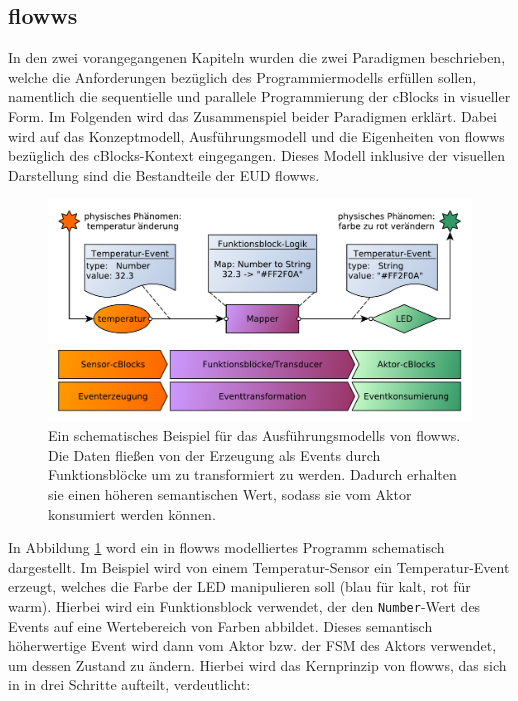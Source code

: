 \subsection{flowws}
In den zwei vorangegangenen Kapiteln wurden die zwei Paradigmen beschrieben, welche die Anforderungen bezüglich des Programmiermodells erfüllen sollen, namentlich die sequentielle und parallele Programmierung der cBlocks in visueller Form. Im Folgenden wird das Zusammenspiel beider Paradigmen erklärt. Dabei wird auf das Konzeptmodell, Ausführungsmodell und die Eigenheiten von flowws bezüglich des cBlocks-Kontext eingegangen. Dieses Modell inklusive der visuellen Darstellung sind die Bestandteile der \ac{EUD} flowws.

\begin{figure}[h]
  \centering
  \includegraphics[width=1\textwidth]{bilder/chapter4/chapter4_2/flowwsschematicexample.pdf}
  \caption{Ein schematisches Beispiel für das Ausführungsmodells von flowws. Die Daten fließen von der Erzeugung als Events durch Funktionsblöcke um zu transformiert zu werden. Dadurch erhalten sie einen höheren semantischen Wert, sodass sie vom Aktor konsumiert werden können.}
  \label{fig:beispielflowws}
\end{figure}

In Abbildung \ref{fig:beispielflowws} word ein in flowws modelliertes Programm schematisch dargestellt.  Im Beispiel wird von einem Temperatur-Sensor ein Temperatur-Event erzeugt, welches die Farbe der LED manipulieren soll (blau für kalt, rot für warm). Hierbei wird ein Funktionsblock verwendet, der den \texttt{Number}-Wert des Events auf eine Wertebereich von Farben abbildet. Dieses semantisch höherwertige Event wird dann vom Aktor bzw. der \ac{FSM} des Aktors verwendet, um dessen Zustand zu ändern. Hierbei wird das Kernprinzip von flowws, das sich in in drei Schritte aufteilt, verdeutlicht:

